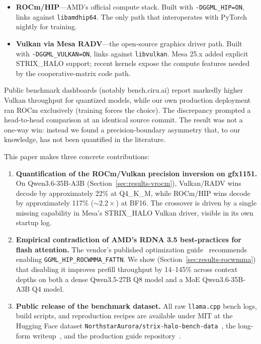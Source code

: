 \documentclass[10pt,a4paper]{article}
\begin{document}
\begin{itemize}
  \item \textbf{ROCm/HIP}---AMD's official compute stack. Built with \texttt{-DGGML\_HIP=ON}, links against \texttt{libamdhip64}. The only path that interoperates with PyTorch nightly for training.
  \item \textbf{Vulkan via Mesa RADV}---the open-source graphics driver path. Built with \texttt{-DGGML\_VULKAN=ON}, links against \texttt{libvulkan}. Mesa 25.x added explicit STRIX\_HALO support; recent kernels expose the compute features needed by the cooperative-matrix code path.
\end{itemize}

Public benchmark dashboards (notably bench.ciru.ai) report markedly higher Vulkan throughput for quantized models, while our own production deployment ran ROCm exclusively (training forces the choice). The discrepancy prompted a head-to-head comparison at an identical source commit. The result was not a one-way win: instead we found a precision-boundary asymmetry that, to our knowledge, has not been quantified in the literature.

This paper makes three concrete contributions:

\begin{enumerate}
  \item \textbf{Quantification of the ROCm/Vulkan precision inversion on gfx1151.} On Qwen3.6-35B-A3B (Section~\ref{sec:results-vrocm}), Vulkan/RADV wins decode by approximately 22\% at Q4\_K\_M, while ROCm/HIP wins decode by approximately 117\% (\(\sim 2.2\times\)) at BF16. The crossover is driven by a single missing capability in Mesa's STRIX\_HALO Vulkan driver, visible in its own startup log.
  \item \textbf{Empirical contradiction of AMD's RDNA 3.5 best-practices for flash attention.} The vendor's published optimization guide~\cite{amdrdna35} recommends enabling \texttt{GGML\_HIP\_ROCWMMA\_FATTN}. We show (Section~\ref{sec:results-rocwmma}) that disabling it improves prefill throughput by 14--145\% across context depths on both a dense Qwen3.5-27B Q8 model and a MoE Qwen3.6-35B-A3B Q4 model.
  \item \textbf{Public release of the benchmark dataset.} All raw \texttt{llama.cpp} bench logs, build scripts, and reproduction recipes are available under MIT at the Hugging Face dataset \texttt{NorthstarAurora/strix-halo-bench-data}~\cite{benchdata}, the long-form writeup~\cite{longform}, and the production guide repository~\cite{guide}.
\end{enumerate}
\end{document}
